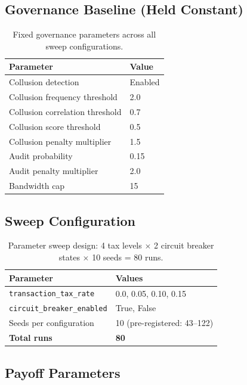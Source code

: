 \documentclass[11pt]{article}
\begin{document}
\subsection{Governance Baseline (Held Constant)}

\begin{table}[H]
\centering
\caption{Fixed governance parameters across all sweep configurations.}
\label{tab:governance}
\small
\begin{tabular}{@{}ll@{}}
\toprule
Parameter & Value \\
\midrule
Collusion detection & Enabled \\
Collusion frequency threshold & 2.0 \\
Collusion correlation threshold & 0.7 \\
Collusion score threshold & 0.5 \\
Collusion penalty multiplier & 1.5 \\
Audit probability & 0.15 \\
Audit penalty multiplier & 2.0 \\
Bandwidth cap & 15 \\
\bottomrule
\end{tabular}
\end{table}

\subsection{Sweep Configuration}

\begin{table}[H]
\centering
\caption{Parameter sweep design: 4 tax levels $\times$ 2 circuit breaker states $\times$ 10 seeds = 80 runs.}
\label{tab:sweep}
\small
\begin{tabular}{@{}ll@{}}
\toprule
Parameter & Values \\
\midrule
\texttt{transaction\_tax\_rate} & 0.0, 0.05, 0.10, 0.15 \\
\texttt{circuit\_breaker\_enabled} & True, False \\
Seeds per configuration & 10 (pre-registered: 43--122) \\
\textbf{Total runs} & \textbf{80} \\
\bottomrule
\end{tabular}
\end{table}

\subsection{Payoff Parameters}
\end{document}

